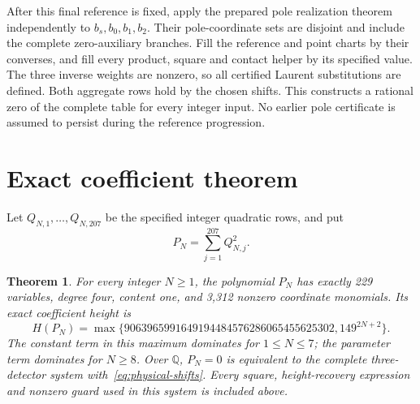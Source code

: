 \documentclass[11pt,a4paper]{article}
\newtheorem{theorem}{Theorem}[section]
\newcommand{\Q}{\mathbb Q}\newcommand{\Z}{\mathbb Z}
\begin{document}
After this final reference is fixed, apply the prepared pole
realization theorem independently to $b_s,b_0,b_1,b_2$.
Their pole-coordinate sets are disjoint and include the complete
zero-auxiliary branches. Fill the reference and point charts by
their converses, and fill every product, square and contact helper
by its specified value. The three inverse weights are nonzero,
so all certified Laurent substitutions are defined. Both aggregate
rows hold by the chosen shifts. This constructs a rational zero
of the complete table for every integer input. No earlier pole
certificate is assumed to persist during the reference progression.

\section{Exact coefficient theorem}

Let $Q_{N,1},\ldots,Q_{N,207}$ be the specified integer quadratic
rows, and put
\[
 P_N=\sum_{j=1}^{207}Q_{N,j}^2.
\]

\begin{theorem}\label{thm:coefficients}
For every integer $N\ge1$, the polynomial $P_N$ has exactly 229
variables, degree four, content one, and 3,312 nonzero coordinate
monomials. Its exact coefficient height is
\[
 H(P_N)=\max\{9063965991649194484576286065455625302,149^{2N+2}\}.
\]
The constant term in this maximum dominates for $1\le N\le7$;
the parameter term dominates for $N\ge8$.
Over $\Q$, $P_N=0$ is equivalent to the complete three-detector
system with~\eqref{eq:physical-shifts}. Every square, height-recovery
expression and nonzero guard used in this system is included above.
\end{theorem}
\end{document}
